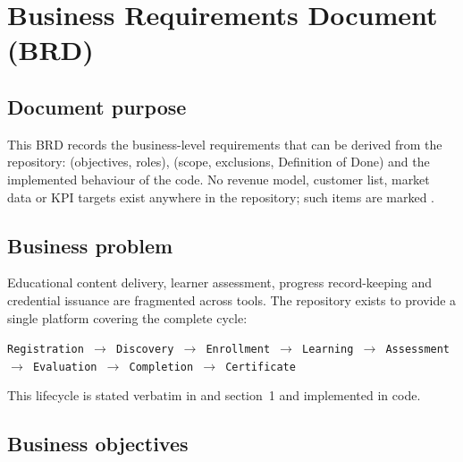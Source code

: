 \section{Business Requirements Document (BRD)}
\label{sec:brd}

\subsection{Document purpose}
This BRD records the business-level requirements that can be derived from the repository:  (objectives, roles),  (scope, exclusions, Definition of Done) and the implemented behaviour of the code. No revenue model, customer list, market data or KPI targets exist anywhere in the repository; such items are marked .

\subsection{Business problem}

Educational content delivery, learner assessment, progress record-keeping and credential issuance are fragmented across tools. The repository exists to provide a single platform covering the complete cycle:

\begin{center}
\texttt{Registration $\rightarrow$ Discovery $\rightarrow$ Enrollment $\rightarrow$ Learning $\rightarrow$ Assessment $\rightarrow$ Evaluation $\rightarrow$ Completion $\rightarrow$ Certificate}
\end{center}

\noindent This lifecycle is stated verbatim in  and  section~1 and implemented in code.

\subsection{Business objectives}


